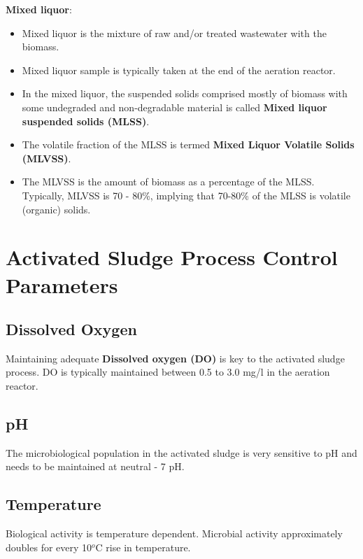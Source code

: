     \begin{mdframed}[backgroundcolor=blue!20] 
\textbf{Mixed liquor}:
\begin{itemize}
\item Mixed liquor is the mixture of raw and/or treated wastewater with the biomass.
\item Mixed liquor sample is typically taken at the end of the aeration reactor.
\item In the mixed liquor, the suspended solids comprised mostly of biomass with some undegraded and non-degradable material is called \textbf{Mixed liquor suspended solids (MLSS)}.  
\item The volatile fraction of the MLSS is termed \textbf{Mixed Liquor Volatile Solids (MLVSS)}.  \item The MLVSS is the amount of biomass as a percentage of the MLSS.  Typically, MLVSS is 70 - 80\%, implying that 70-80\% of the MLSS is volatile (organic) solids.
\end{itemize}
    \end{mdframed}

\section{Activated Sludge Process Control Parameters}

\subsection{Dissolved Oxygen}

Maintaining adequate \textbf{Dissolved oxygen (DO)} is key to the activated sludge process.  DO is typically maintained between 0.5 to 3.0 mg/l in the aeration reactor.\\

\subsection{pH}

The microbiological population in the activated sludge is very sensitive to pH and needs to be maintained at neutral - 7 pH.

\subsection{Temperature}

Biological activity is temperature dependent.  Microbial activity approximately doubles for every 10$^o$C rise in temperature.\\

